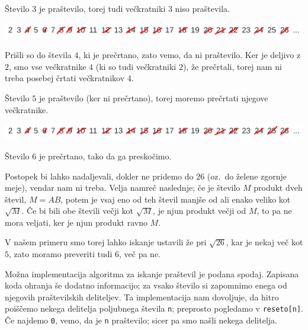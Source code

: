 Število $3$ je praštevilo, torej tudi večkratniki $3$ niso praštevila.

\includegraphics[width=\linewidth]{chapters/teorija-stevil/slike/reseto3}

Prišli so do števila $4$, ki je prečrtano, zato vemo, da ni praštevilo.
Ker je deljivo z $2$, smo vse večkratnike $4$ (ki so tudi večkratniki $2$), že
prečrtali, torej nam ni treba posebej črtati večkratnikov $4$.

Število $5$ je praštevilo (ker ni prečrtano), torej moremo prečrtati njegove
večkratnike.

\includegraphics[width=\linewidth]{chapters/teorija-stevil/slike/reseto4}

Število $6$ je prečrtano, tako da ga preskočimo.

Postopek bi lahko nadaljevali, dokler ne pridemo do $26$ (oz.~do želene zgornje
meje), vendar nam ni treba.
Velja namreč naslednje; če je število $M$ produkt dveh števil, $M = A B$, potem
je vsaj eno od teh števil manjše od ali enako veliko kot $\sqrt{M}$.
Če bi bili obe števili večji kot $\sqrt{M}$, je njun produkt večji od $M$, to pa
ne mora veljati, ker je njun produkt ravno $M$.

V našem primeru smo torej lahko iskanje ustavili že pri $\sqrt{26}$, kar je
nekaj več kot $5$, zato moramo preveriti tudi $6$, več pa ne.

\begin{examples}
  Možna implementacija algoritma za iskanje praštevil je podana spodaj.
  Zapisana koda ohranja še dodatno informacijo; za vsako število si zapomnimo
  enega od njegovih praštevilskih deliteljev.
  Ta implementacija nam dovoljuje, da hitro poiščemo nekega delitelja poljubnega
  števila \verb+n+; preprosto pogledamo v \verb+reseto[n]+.
  Če najdemo \verb+0+, vemo, da je \verb+n+ praštevilo; sicer pa smo našli
  nekega delitelja.
\end{examples}

